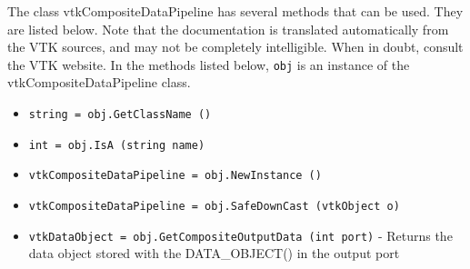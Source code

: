 The class vtkCompositeDataPipeline has several methods that can be used.
  They are listed below.
Note that the documentation is translated automatically from the VTK sources,
and may not be completely intelligible.  When in doubt, consult the VTK website.
In the methods listed below, \verb|obj| is an instance of the vtkCompositeDataPipeline class.
\begin{itemize}
\item  \verb|string = obj.GetClassName ()|

\item  \verb|int = obj.IsA (string name)|

\item  \verb|vtkCompositeDataPipeline = obj.NewInstance ()|

\item  \verb|vtkCompositeDataPipeline = obj.SafeDownCast (vtkObject o)|

\item  \verb|vtkDataObject = obj.GetCompositeOutputData (int port)| -  Returns the data object stored with the DATA\_OBJECT() in the
 output port

\end{itemize}
